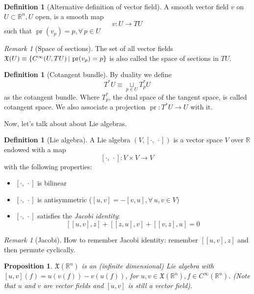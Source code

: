 \documentclass[a4paper,11pt,titlepage]{article}
\numberwithin{equation}{section}
\newtheorem{proposition}[theorem]{Proposition}
\theoremstyle{definition}
\newtheorem{definition}[theorem]{Definition}
\theoremstyle{remark}
\newtheorem{remark}[theorem]{Remark}
\DeclareMathOperator{\pr}{pr}
\newcommand{\rfield}{\mathbb{R}}
\begin{document}
\begin{definition}[Alternative definition of vector field]
  A smooth vector field $v$ on $U \subset \rfield^n, U$ open, is a smooth map
  \begin{equation}
    v \colon U \rightarrow TU
  \end{equation}
  such that $\pr(v_p) = p, \forall \, p \in U$ %
\end{definition}
\newpage
\begin{remark} [Space of sections]
  The set of all vector fields $\mathfrak{X}(U) \equiv \{ C^\infty(U, TU) \, | \\ \, \pr(v_p) = p \}$ is also called the space of sections in $TU$.
\end{remark}

\begin{definition} [Cotangent bundle]
  By duality we define
  \begin{equation}
    T^*U \equiv \underset{p \in U}{\sqcup} T_p^* U
  \end{equation}
  as the cotangent bundle. Where $T^*_p$, the dual space of the tangent space, is called cotangent space. We also associate a projection $\pr \colon T^*U \rightarrow U$ with it.
\end{definition}

Now, let's talk about about Lie algebras.

\begin{definition}[Lie algebra]
  A Lie algebra $(V, [\cdot, \, \cdot])$ is a vector space $V$ over $\rfield$ endowed with a map
  $$[\cdot , \, \cdot] \colon V \times V \rightarrow V$$
  with the following properties:
  \begin{itemize}
    \item $[\cdot , \, \cdot]$ is bilinear
    \item $[\cdot , \, \cdot]$ is antisymmetric ($[u, v] = -[v, u], \forall \, u, v \in V$)
    \item $[\cdot , \, \cdot]$ satisfies the \textit{Jacobi identity}:
    $$[[u, v], z] + [[z, u], v] + [[v, z], u] = 0$$
  \end{itemize}
\end{definition}

\begin{remark}[Jacobi]
  How to remember Jacobi identity: remember $[[u, v], z]$ and then  permute cyclically.
\end{remark}

\begin{proposition}
  $\mathfrak{X}(\rfield^n)$ is an (infinite dimensional) Lie algebra with $[u, v](f) = u(v(f)) - v(u(f))$, for $u, v \in \mathfrak{X}(\rfield^n), f \in C^\infty(\rfield^n)$. (Note that $u$ and $v$ are vector fields and $[u, v]$ is still a vector field).
\end{proposition}
\end{document}
